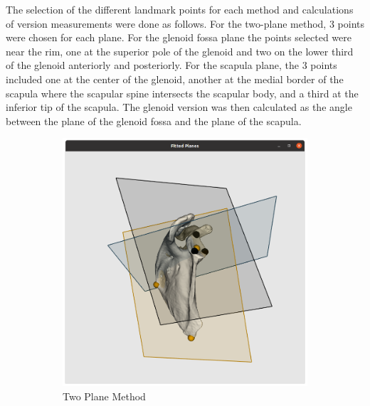 The selection of the different landmark points for each method and calculations of version measurements were done as follows. For the two-plane method, 3 points were chosen for each plane. For the glenoid fossa plane the points selected were near the rim, one at the superior pole of the glenoid and two on the lower third of the glenoid anteriorly and posteriorly.  For the scapula plane, the 3 points included one at the center of the glenoid, another at the medial border of the scapula where the scapular spine intersects the scapular body, and a third at the inferior tip of the scapula. The glenoid version was then calculated as the angle between the plane of the glenoid fossa and the plane of the scapula. 
\begin{figure}
        \begin{center}
                \begin{subfigure}[b]{0.31\linewidth}
			\includegraphics[width=\linewidth]{figures/planes_vis.png}
			\caption{\label{fig:visplanes}Two Plane Method}
		\end{subfigure}	
                \begin{subfigure}[b]{0.28\linewidth}

\end{subfigure}
\end{center}
\end{figure}
